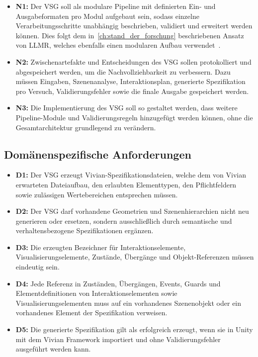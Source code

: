 \begin{itemize}
    \item \textbf{N1:} Der VSG soll als modulare Pipeline mit definierten Ein- und Ausgabeformaten pro Modul aufgebaut sein, sodass einzelne Verarbeitungsschritte unabhängig beschrieben, validiert und erweitert werden können. Dies folgt dem in~\ref{ch:stand_der_forschung} beschriebenen Ansatz von LLMR, welches ebenfalls einen modularen Aufbau verwendet~\cite{delatorreLLMRRealtimePrompting2024}.
    \item \textbf{N2:} Zwischenartefakte und Entscheidungen des VSG sollen protokolliert und abgespeichert werden, um die Nachvollziehbarkeit zu verbessern. Dazu müssen Eingaben, Szenenanalyse, Interaktionsplan, generierte Spezifikation pro Versuch, Validierungsfehler sowie die finale Ausgabe gespeichert werden.
    \item \textbf{N3:} Die Implementierung des VSG soll so gestaltet werden, dass weitere Pipeline-Module und Validierungsregeln hinzugefügt werden können, ohne die Gesamtarchitektur grundlegend zu verändern.
\end{itemize}


\subsection*{Domänenspezifische Anforderungen}
\begin{itemize}
    \item \textbf{D1:} Der VSG erzeugt Vivian-Spezifikationsdateien, welche dem von Vivian erwarteten Dateiaufbau, den erlaubten Elementtypen, den Pflichtfeldern sowie zulässigen Wertebereichen entsprechen müssen.

    \item \textbf{D2:} Der VSG darf vorhandene Geometrien und Szenenhierarchien nicht neu generieren oder ersetzen, sondern ausschließlich durch semantische und verhaltensbezogene Spezifikationen ergänzen.

    \item \textbf{D3:} Die erzeugten Bezeichner für Interaktionselemente, Visualisierungselemente, Zustände, Übergänge und Objekt-Referenzen müssen eindeutig sein.

    \item \textbf{D4:} Jede Referenz in Zuständen, Übergängen, Events, Guards und Elementdefinitionen von Interaktionselementen sowie Visualisierungselementen muss auf ein vorhandenes Szenenobjekt oder ein vorhandenes Element der Spezifikation verweisen.

    \item\textbf{D5:} Die generierte Spezifikation gilt als erfolgreich erzeugt, wenn sie in Unity mit dem Vivian Framework importiert und ohne Validierungsfehler ausgeführt werden kann.
\end{itemize}

